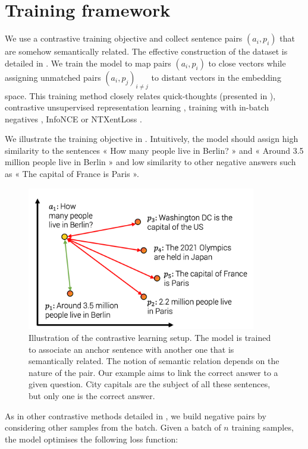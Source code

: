\section{Training framework}

We use a contrastive training objective and collect sentence pairs $(a_i, p_i)$ that are somehow semantically related. The effective construction of the dataset is detailed in . We train the model to map pairs $(a_i , p_i)$ to close vectors while assigning unmatched pairs $(a_i , p_j)_{i \neq j}$ to distant vectors in the embedding space. This training method closely relates quick-thoughts (presented in ), contrastive unsupervised representation learning \parencite{saunshi_19}, training with in-batch negatives \parencite{carlsson_21}, InfoNCE \parencite{oord_18} or NTXentLoss \parencite{sohn_16}.

We illustrate the training objective in . Intuitively, the model should assign high similarity to the sentences « How many people live in Berlin? » and « Around 3.5 million people live in Berlin » and low similarity to other negative answers such as « The capital of France is Paris ».

\begin{figure}[htb!]
	\includegraphics[width=10cm]{images/contrastive_1.png}
	\caption[Contrastive learning]{Illustration of the contrastive learning setup. The model is trained to associate an anchor sentence with another one that is semantically related. The notion of semantic relation depends on the nature of the pair. Our example aims to link the correct answer to a given question. City capitals are the subject of all these sentences, but only one is the correct answer.}
\end{figure}

As in other contrastive methods detailed in , we build negative pairs by considering other samples from the batch. Given a batch of $n$ training samples, the model optimises the following loss function:

